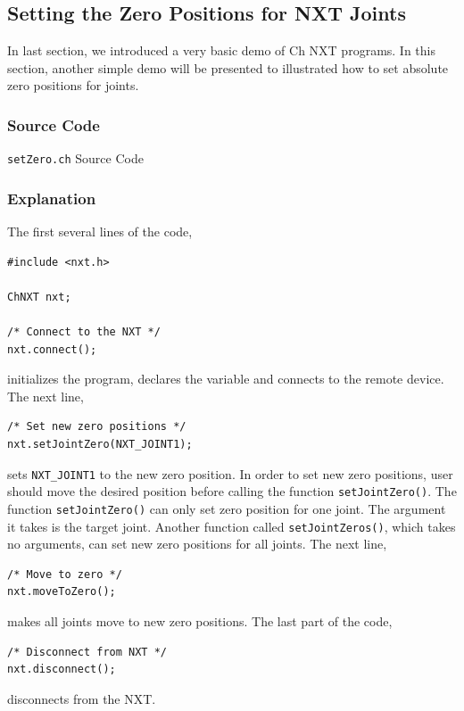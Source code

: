 \documentclass[11pt]{article}
\begin{document}
\subsection{\label{sec:setzero_demo}Setting the Zero Positions for NXT Joints}
In last section, we introduced a very basic demo of Ch NXT programs. In this section, another simple demo
will be presented to illustrated how to set absolute zero positions for joints.

\subsubsection*{Source Code}
\begin{Program}[H]
    {\small}
    \caption{\texttt{setZero.ch} Source Code\label{prog_setZero.ch}}
\end{Program}

\subsubsection*{Explanation}
The first several lines of the code,\\
\begin{verbatim}
#include <nxt.h>

ChNXT nxt;

/* Connect to the NXT */
nxt.connect();
\end{verbatim}
\noindent
initializes the program, declares the variable and connects to the remote device. The next line,
\begin{verbatim}
/* Set new zero positions */
nxt.setJointZero(NXT_JOINT1);
\end{verbatim}
\noindent
sets \texttt{NXT\_JOINT1} to the new zero position. In order to set new zero positions, user should 
move the desired position before calling the function \texttt{setJointZero()}. The function \texttt{setJointZero()} 
can only set zero position for one joint. The argument it takes is the target joint. Another function called 
\texttt{setJointZeros()}, which takes no arguments, can set new zero positions for all joints. The next line,
\begin{verbatim}
/* Move to zero */
nxt.moveToZero();
\end{verbatim}
\noindent
makes all joints move to new zero positions. The last part of the code,
\begin{verbatim}
/* Disconnect from NXT */
nxt.disconnect();
\end{verbatim}
\noindent
disconnects from the NXT.
\end{document}
